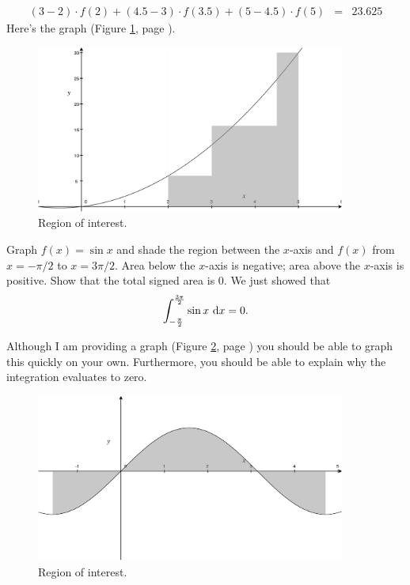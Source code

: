 \documentclass[12pt,addpoints, answers, fleqn]{exam}
\begin{document}
\begin{questions}
\begin{solution}
\begin{eqnarray*}
\left( 3 - 2 \right) \cdot f \left( 2 \right) + \left(4.5-3 \right) \cdot f \left(3.5 \right) + \left(5-4.5 \right) \cdot f \left(5 \right) &=& 23.625
\end{eqnarray*}
Here's the graph (Figure \ref{fig:sa03}, page \pageref{fig:sa03}).
\end{solution}
\begin{figure}[htbp] %
   \centering
   \includegraphics[width=4in]{./graphics/sa03.pdf} 
   \caption{Region of interest.}
   \label{fig:sa03}
\end{figure}
\question Graph $f\left(x\right) = \sin x$ and shade the region between the $x$-axis and $f\left(x\right)$ from $x=-\pi/2$ to $x=3\pi/2$. Area below the $x$-axis is negative; area above the $x$-axis is positive. Show that the total signed area is $0$. We just showed that
\[
\int_{-\frac{\pi}{2}}^{\frac{3\pi}{2}} \sin x \ {\rm{d}}x = 0.
\]

\begin{solution}
Although I am providing a graph (Figure \ref{fig:sa04}, page \pageref{fig:sa04}) you should be able to graph this quickly on your own. Furthermore, you should be able to explain why the integration evaluates to zero.
\end{solution}
\begin{figure}[htbp] %
   \centering
   \includegraphics[width=4in]{./graphics/sa04.pdf} 
   \caption{Region of interest.}
   \label{fig:sa04}
\end{figure}
\end{questions}
\end{document}
